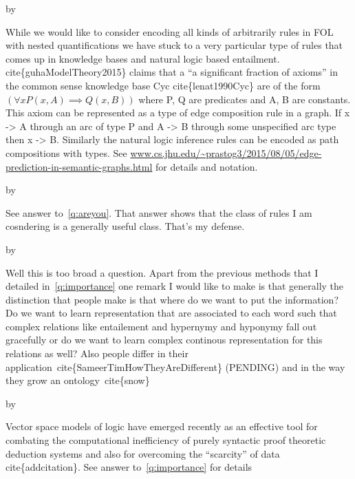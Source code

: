 \documentclass[12pt,answers]{exam} %
\makeatletter
\renewcommand{\cite}[1]{cite\{#1\}}
\def\SetTotalwidth{\advance\linewidth by \@totalleftmargin
\@totalleftmargin=0pt}
\newcommand{\answer}[1]{
\ifprintanswers
\SetTotalwidth
  \begin{solution}[0in]#1\end{solution}
\else \fi
}
\makeatother
\begin{document}
\begin{questions}
   \answer{While we would
    like to consider encoding all kinds of arbitrarily rules in FOL
    with nested quantifications we have stuck to a very particular
    type of rules that comes up in knowledge bases and natural logic
    based entailment. \cite{guhaModelTheory2015} claims that a ``a
    significant fraction of axioms'' in the common sense knowledge
    base Cyc \cite{lenat1990Cyc} are of the form
    $(\forall x P(x,A) \implies Q(x,B))$ where P, Q are predicates and
    A, B are constants. This axiom can be represented as a type of
    edge composition rule in a graph. If x -> A through an arc of type
    P and A -> B through some unspecified arc type then x ->
    B. Similarly the natural logic inference rules can be encoded as
    path compositions with types. See
    \url{www.cs.jhu.edu/~prastog3/2015/08/05/edge-prediction-in-semantic-graphs.html}
    for details and notation.  }

      \answer{See answer to~\ref{q:areyou}. That
    answer shows that the class of rules I am cosndering is a
    generally useful class. That's my defense.}

  \answer{Well this is too broad a question. Apart from the previous
    methods that I detailed in~\ref{q:importance} one remark I would
    like to make is that generally the distinction that people make is
    that where do we want to put the information? Do we want to learn
    representation that are associated to each word such that complex
    relations like entailement and hypernymy and hyponymy fall out
    gracefully or do we want to learn complex continous representation
    for this relations as well? Also people differ in their
    application~\cite{SameerTimHowTheyAreDifferent} (PENDING) and in
    the way they grow an ontology~\cite{snow} }

  \answer{Vector space models of logic have emerged recently as an
    effective tool for combating the computational inefficiency of
    purely syntactic proof theoretic deduction systems and also for
    overcoming the ``scarcity'' of data \cite{addcitation}. See answer
    to~\ref{q:importance} for details}


\end{questions}
\end{document}
